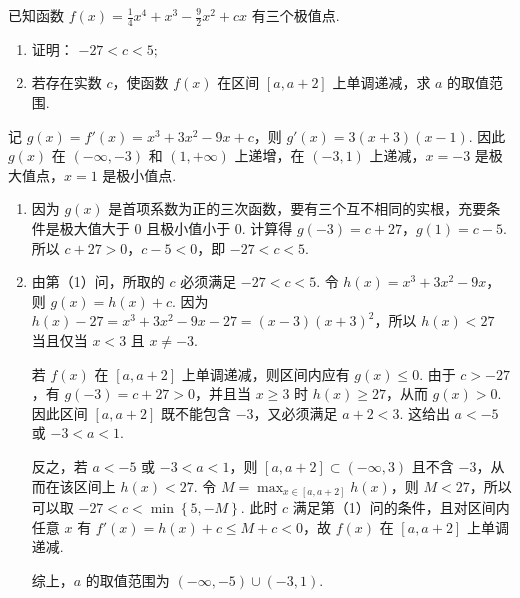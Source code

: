 \begin{problem}
已知函数 \( f(x) = \frac{1}{4} x^4 + x^3 - \frac{9}{2} x^2 + cx \) 有三个极值点.
\begin{enumerate}
\item 证明： \( -27 < c < 5; \)
\item 若存在实数 \(c\)，使函数 \(f(x)\) 在区间 \([a, a + 2]\) 上单调递减，求 \(a\) 的取值范围.
\end{enumerate}

\begin{solution}
记 \(g(x)=f'(x)=x^3+3x^2-9x+c\)，则
\(g'(x)=3\left(x+3\right)\left(x-1\right)\). 因此 \(g(x)\) 在 \((-\infty,-3)\) 和 \((1,+\infty)\) 上递增，在 \((-3,1)\) 上递减，\(x=-3\) 是极大值点，\(x=1\) 是极小值点.

\begin{enumerate}
\item 因为 \(g(x)\) 是首项系数为正的三次函数，要有三个互不相同的实根，充要条件是极大值大于 \(0\) 且极小值小于 \(0\). 计算得
\(g(-3)=c+27\)，\(g(1)=c-5\). 所以 \(c+27>0\)，\(c-5<0\)，即
\(-27<c<5\).

\item 由第（1）问，所取的 \(c\) 必须满足 \(-27<c<5\). 令
\(h(x)=x^3+3x^2-9x\)，则 \(g(x)=h(x)+c\). 因为
\(h(x)-27=x^3+3x^2-9x-27=\left(x-3\right)\left(x+3\right)^2\)，所以 \(h(x)<27\) 当且仅当 \(x<3\) 且 \(x\neq-3\).

若 \(f(x)\) 在 \([a,a+2]\) 上单调递减，则区间内应有 \(g(x)\leqslant0\). 由于 \(c>-27\)，有 \(g(-3)=c+27>0\)，并且当 \(x\geqslant3\) 时 \(h(x)\geqslant27\)，从而 \(g(x)>0\). 因此区间 \([a,a+2]\) 既不能包含 \(-3\)，又必须满足 \(a+2<3\). 这给出
\(a<-5\) 或 \(-3<a<1\).

反之，若 \(a<-5\) 或 \(-3<a<1\)，则 \([a,a+2]\subset(-\infty,3)\) 且不含 \(-3\)，从而在该区间上 \(h(x)<27\). 令 \(M=\max_{x\in[a,a+2]}h(x)\)，则 \(M<27\)，所以可以取
\(-27<c<\min\left\{5,-M\right\}\). 此时 \(c\) 满足第（1）问的条件，且对区间内任意 \(x\) 有 \(f'(x)=h(x)+c\leqslant M+c<0\)，故 \(f(x)\) 在 \([a,a+2]\) 上单调递减.

综上，\(a\) 的取值范围为 \(\left(-\infty,-5\right)\cup\left(-3,1\right)\).
\end{enumerate}
\end{solution}
\end{problem}
